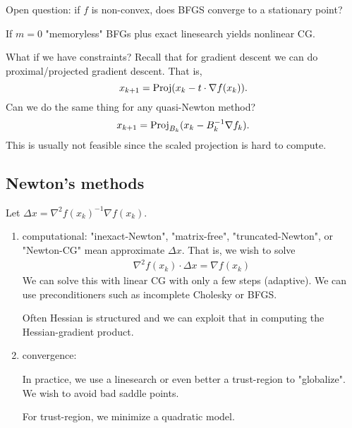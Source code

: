 \documentclass[class=article,crop=false]{standalone}
\begin{document}
Open question: if $ f$ is non-convex, does BFGS converge to a stationary point?

\begin{remark}
If $ m = 0$ "memoryless" BFGs plus exact linesearch yields nonlinear CG.
\end{remark}

\begin{remark}
What if we have constraints? Recall that for gradient descent we can do proximal/projected gradient descent. That is,
\[
	x_{k+1}= \operatorname{Proj}(x_k - t \cdot \nabla f(x_k))
.\] 
Can we do the same thing for any quasi-Newton method? 
\[
	x_{k+1} = \operatorname{Proj}_{B_k} (x_k - B_k^{-1} \nabla f_k)
.\] 
This is usually not feasible since the scaled projection is hard to compute.
\end{remark}
\newpage
\subsection{Newton's methods}
Let $ \Delta x = \nabla ^2 f(x_k) ^{-1} \nabla f(x_k)$.
\begin{enumerate}[label=(\arabic*)]
	\item computational: "inexact-Newton", "matrix-free", "truncated-Newton", or "Newton-CG" mean approximate $ \Delta x$. That is, we wish to solve
		\begin{align*}
			\nabla ^2 f(x_k) \cdot \Delta x = \nabla f(x_k)
		\end{align*}
		We can solve this with linear CG with only a few steps (adaptive). We can use preconditioners such as incomplete Cholesky or BFGS. 

		Often Hessian is structured and we can exploit that in computing the Hessian-gradient product.
	\item convergence:

		In practice, we use a linesearch or even better a trust-region to "globalize". We wish to avoid bad saddle points.

		For trust-region, we minimize a quadratic model.
\end{enumerate}
\end{document}
